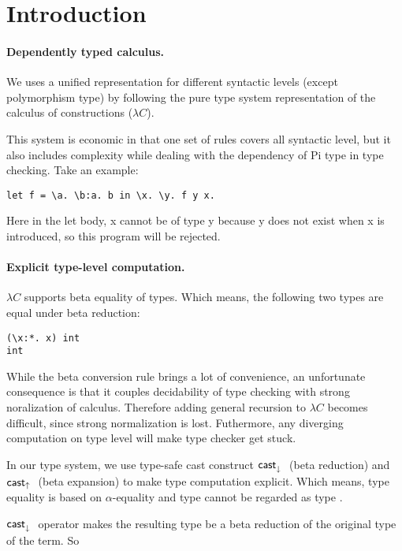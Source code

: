 \section{Introduction}

\paragraph{Dependently typed calculus.} We uses a unified representation for different syntactic levels (except polymorphism type) by following the pure type system representation of the calculus of constructions ($\lambda C$).

This system is economic in that one set of rules covers all syntactic level, but it also includes complexity while dealing with the dependency of Pi type in type checking. Take an example:

\begin{lstlisting}
let f = \a. \b:a. b in \x. \y. f y x.
\end{lstlisting}

Here in the let body, \lst x cannot be of type \lst y because \lst y does not exist when \lst x is introduced, so this program will be rejected.

\paragraph{Explicit type-level computation.} $\lambda C$ supports beta equality of types. Which means, the following two types are equal under beta reduction:

\begin{lstlisting}
(\x:*. x) int
int
\end{lstlisting}

While the beta conversion rule brings a lot of convenience, an unfortunate consequence is that it couples decidability of type checking with strong noralization of calculus. Therefore adding general recursion to $\lambda C$ becomes difficult, since strong normalization is lost. Futhermore, any diverging computation on type level will make type checker get stuck.

In our type system, we use type-safe cast construct $\mathsf{cast}_\downarrow^{}~$ (beta reduction) and $\mathsf{cast}_\uparrow~$ (beta expansion) to make type computation explicit. Which means, type equality is based on $\alpha$-equality and type  cannot be regarded as type .

$\mathsf{cast}_\downarrow^{}~$ operator makes the resulting type be a beta reduction of the original type of the term. So

